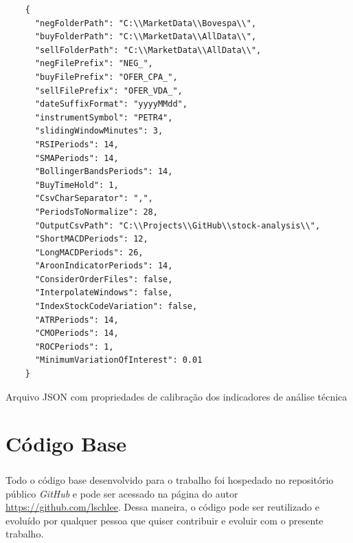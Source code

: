 \documentclass[grad,numbers]{coppe}
\begin{document}
    \begin{listing}
    \begin{verbatim}
    {
      "negFolderPath": "C:\\MarketData\\Bovespa\\",
      "buyFolderPath": "C:\\MarketData\\AllData\\",
      "sellFolderPath": "C:\\MarketData\\AllData\\",
      "negFilePrefix": "NEG_",
      "buyFilePrefix": "OFER_CPA_",
      "sellFilePrefix": "OFER_VDA_",
      "dateSuffixFormat": "yyyyMMdd",
      "instrumentSymbol": "PETR4",
      "slidingWindowMinutes": 3,
      "RSIPeriods": 14,
      "SMAPeriods": 14,
      "BollingerBandsPeriods": 14,
      "BuyTimeHold": 1,
      "CsvCharSeparator": ",",
      "PeriodsToNormalize": 28,
      "OutputCsvPath": "C:\\Projects\\GitHub\\stock-analysis\\",
      "ShortMACDPeriods": 12,
      "LongMACDPeriods": 26,
      "AroonIndicatorPeriods": 14,
      "ConsiderOrderFiles": false,
      "InterpolateWindows": false,
      "IndexStockCodeVariation": false,
      "ATRPeriods": 14,
      "CMOPeriods": 14,
      "ROCPeriods": 1,
      "MinimumVariationOfInterest": 0.01
    }
    \end{verbatim}
    \caption{Arquivo JSON com propriedades de calibração dos indicadores de análise técnica} 
    \label{json-example}
    \end{listing}
    
    \chapter{Código Base}
        \paragraph{}Todo o código base desenvolvido para o trabalho foi hospedado no repositório público \textit{GitHub} e pode ser acessado na página do autor \url{https://github.com/lschlee}. Dessa maneira, o código pode ser reutilizado e evoluído por qualquer pessoa que quiser contribuir e evoluir com o presente trabalho. 
        
\end{document}
